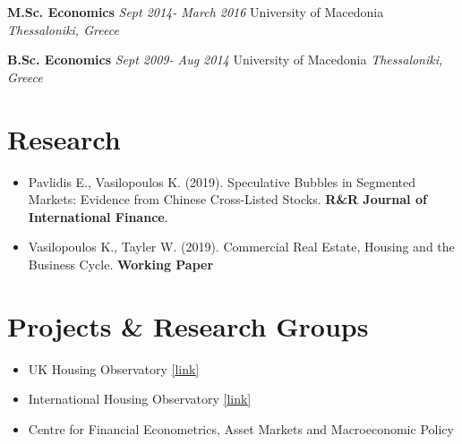 \documentclass[10pt,]{article}
\begin{document}
              \textbf{M.Sc. Economics} \hfill  { \emph{Sept 2014- March 2016} }
              \newline  University of Macedonia \hfill { \emph{Thessaloniki, Greece} }
              
              \textbf{B.Sc. Economics} \hfill  { \emph{Sept 2009- Aug 2014} }
              \newline  University of Macedonia \hfill { \emph{Thessaloniki, Greece} }
              
              \hypertarget{research}{%
              \section{Research}\label{research}}
              
              \begin{itemize}
              \item
                Pavlidis E., Vasilopoulos K. (2019). Speculative Bubbles in Segmented
                Markets: Evidence from Chinese Cross-Listed Stocks. \textbf{R\&R
                Journal of International Finance}.
              \item
                Vasilopoulos K., Tayler W. (2019). Commercial Real Estate, Housing and
                the Business Cycle. \textbf{Working Paper}
              \end{itemize}
              
              \hypertarget{projects-research-groups}{%
              \section{Projects \& Research Groups}\label{projects-research-groups}}
              
              \begin{itemize}
              \item
                UK Housing Observatory
                \href{http://www.lancaster.ac.uk/lums/economics/research/housing/}{{[}link{]}}
              \item
                International Housing Observatory
                \href{https://lancs-macro.shinyapps.io/international-housing-observatory/}{{[}link{]}}
              \item
                Centre for Financial Econometrics, Asset Markets and Macroeconomic
                Policy
              \end{itemize}
              
\end{document}

